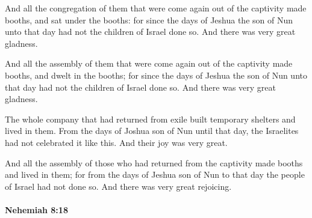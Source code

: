 			And all the congregation of them that were come again out of the captivity made booths, and sat under the booths: for since the days of Jeshua the son of Nun unto that day had not the children of Israel done so. And there was very great gladness.

			\begin{versebox}
					\item[BHS] 
					\item[LXX] 
					\item[ASV] And all the assembly of them that were come again out of the captivity made booths, and dwelt in the booths; for since the days of Jeshua the son of Nun unto that day had not the children of Israel done so. And there was very great gladness.
					\item[NIV] The whole company that had returned from exile built temporary shelters and lived in them. From the days of Joshua son of Nun until that day, the Israelites had not celebrated it like this. And their joy was very great.
					\item[NRSV] And all the assembly of those who had returned from the captivity made booths and lived in them; for from the days of Jeshua son of Nun to that day the people of Israel had not done so. And there was very great rejoicing.
			\end{versebox}

		\paragraph{Nehemiah 8:18} %
			\label{NEHEMIAH-8-18}


